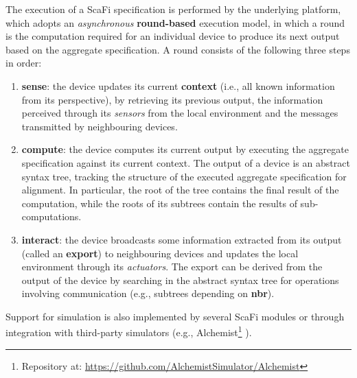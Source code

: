 The execution of a \ac{ScaFi} specification is performed by the underlying
platform, which adopts an \textit{asynchronous} \textbf{round-based} execution
model, in which a round is the computation required for an individual device to
produce its next output based on the aggregate specification. A round consists
of the following three steps in order:
\begin{enumerate}
  \item \textbf{sense}: the device updates its current \textbf{context} (i.e.,
        all known information from its perspective), by retrieving its previous
        output, the information perceived through its \textit{sensors} from the
        local environment and the messages transmitted by neighbouring devices.
  \item \textbf{compute}: the device computes its current output by executing
        the aggregate specification against its current context. The output of
        a device is an abstract syntax tree, tracking the structure of the
        executed aggregate specification for alignment. In particular, the root
        of the tree contains the final result of the computation, while the
        roots of its subtrees contain the results of sub-computations.
  \item \textbf{interact}: the device broadcasts some information extracted
        from its output (called an \textbf{export}) to neighbouring devices and
        updates the local environment through its \textit{actuators}. The
        export can be derived from the output of the device by searching in the
        abstract syntax tree for operations involving communication (e.g.,
        subtrees depending on \textbf{nbr}).
\end{enumerate}

Support for simulation is also implemented by several \ac{ScaFi} modules or
through integration with third-party simulators (e.g.,
Alchemist\footnote{Repository at:
\url{https://github.com/AlchemistSimulator/Alchemist}} \cite{Alchemist}).
